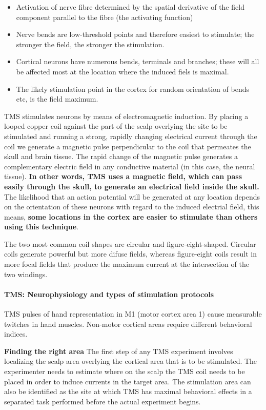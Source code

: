 \documentclass[12pt,article,oneside,a4paper]{memoir}
\begin{document}
\begin{itemize}
\item Activation of nerve fibre determined by the spatial derivative of the field component parallel to the fibre (the activating function)
\item Nerve bends are low-threshold points and therefore easiest to stimulate; the stronger the field, the stronger the stimulation.
\item Cortical neurons have numerous bends, terminals and branches; these will all be affected most at the location where the induced fiels is maximal.
\item The likely stimulation point in the cortex for random orientation of bends etc, is the field maximum.
\end{itemize}

TMS stimulates neurons by means of electromagnetic induction. By placing a looped copper coil against the part of the scalp overlying the site to be stimulated and running a strong, rapidly changing electrical current through the coil we generate a magnetic pulse perpendicular to the coil that permeates the skull and brain tissue. The rapid change of the magnetic pulse generates a complementary electric field in any conductive material (in this case, the neural tissue). \textbf{In other words, TMS uses a magnetic field, which can pass easily through the skull, to generate an electrical field inside  the skull.} The likelihood that an action potential will be generated at any location depends on the orientation of these neurons with regard to the induced electrial field, this means, \textbf{some locations in the cortex are easier to stimulate than others using this technique}.

The two most common coil shapes are circular and figure-eight-shaped. Circular coils generate powerful but more difuse fields, whereas figure-eight coils result in more focal fields that produce the maximum current at the intersection of the two windings.

\paragraph{TMS: Neurophysiology and types of stimulation protocols} TMS pulses of hand representation in M1 (motor cortex area 1) cause measurable twitches in hand muscles. Non-motor cortical areas require different behavioral indices.

\textbf{Finding the right area} The first step of any TMS experiment involves localizing the scalp area overlying the cortical area that is to be stimulated. The experimenter needs to estimate where on the scalp the TMS coil needs to be placed in order to induce currents in the target area. The stimulation area can also be identified as the site at which TMS has maximal behavioral effects in a separated task performed before the actual experiment begins.
\end{document}
